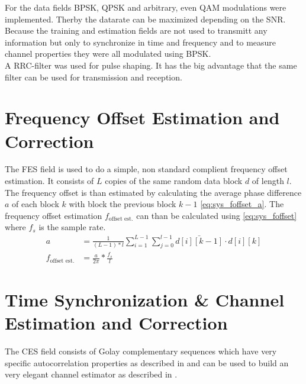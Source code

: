 For the data fields \gls{BPSK}, \gls{QPSK} and arbitrary, even
\gls{QAM} modulations were implemented. Therby the datarate
can be maximized depending on the \gls{SNR}. \\

Because the training and estimation fields are not used to
transmitt any information but only to synchronize in time
and frequency and to measure channel properties they were all
modulated using \gls{BPSK}. \\

A \gls{RRC}-filter was used for pulse shaping. It has the big advantage that
the same filter can be used for transmission and reception. \\

\section{Frequency Offset Estimation and Correction}
The \gls{FES} field is used to do a simple, non standard complient frequency
offset estimation. It consists of $L$ copies of the same random data block $d$
of length $l$.
The frequency offset is than estimated by calculating the average phase
difference $a$ of each block $k$ with block the previous block $k - 1$
\eqref{eq:sys_foffset_a}. The frequency offset estimation
$f_{\text{offset est.}}$ can than be calculated using \eqref{eq:sys_foffset}
where $f_s$ is the sample rate. \\

\begin{subequations}
  \begin{alignat}{2}
    a &= \frac{1}{(L-1) * l}
    \sum_{i=1}^{L-1} \sum_{j=0}^{l-1} \bar{d[i][k-1]} \cdot d[i][k]
    \label{eq:sys_foffset_a} \\
    f_{\text{offset est.}} &= \frac{a}{2 \pi} * \frac{f_s}{l}
    \label{eq:sys_foffset}
  \end{alignat}
\end{subequations}

\section{Time Synchronization \& Channel Estimation and Correction}
The \gls{CES} field consists of Golay complementary sequences which
have very specific autocorrelation properties as described in
 and can be used to build an very elegant
channel estimator as described in . \\

